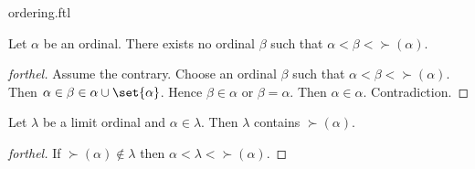 \documentclass{naproche-library}
\begin{document}
\begin{smodule}{ordering.ftl}
  \begin{proposition}[forthel,id=SET_THEORY_02_4240355610329088,printid]
    Let $\alpha$ be an ordinal.
    There exists no ordinal $\beta$ such that $\alpha < \beta < \succ(\alpha)$.
  \end{proposition}
  \begin{proof}[forthel]
    Assume the contrary.
    Choose an ordinal $\beta$ such that $\alpha < \beta < \succ(\alpha)$.
    Then $\alpha \in \beta \in \alpha \cup \set{\alpha}$.
    Hence $\beta \in \alpha$ or $\beta = \alpha$.
    Then $\alpha \in \alpha$.
    Contradiction.
  \end{proof}

  \begin{proposition}[forthel,id=SET_THEORY_02_4659024620421120,printid]
    Let $\lambda$ be a limit ordinal and $\alpha \in \lambda$.
    Then $\lambda$ contains $\succ(\alpha)$.
  \end{proposition}
  \begin{proof}[forthel]
    If $\succ(\alpha) \notin \lambda$ then $\alpha < \lambda < \succ(\alpha)$.
  \end{proof}
\end{smodule}
\end{document}
